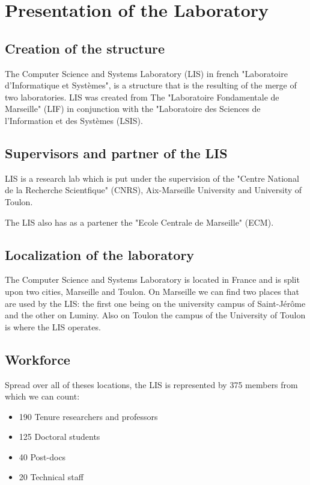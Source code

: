 \chapter{Presentation of the Laboratory}
\section{Creation of the structure}
The Computer Science and Systems Laboratory (LIS) in french "Laboratoire d’Informatique et Systèmes", is a structure that is the resulting of the merge of two laboratories. LIS was created from The "Laboratoire Fondamentale de Marseille" (LIF) in conjunction with the "Laboratoire des Sciences de l'Information et des Systèmes (LSIS).

\section{Supervisors and partner of the LIS}
LIS is a research lab which is put under the supervision of the "Centre National de la Recherche Scientfique" (CNRS), Aix-Marseille University and University of Toulon. 

The LIS also has as a partener the "Ecole Centrale de Marseille" (ECM).

\section{Localization of the laboratory}
The Computer Science and Systems Laboratory is located in France and is split upon two cities, Marseille and Toulon. On Marseille we can find two places that are used by the LIS: the first one being on the university campus of Saint-Jérôme and the other on Luminy. Also on Toulon the campus of the University of Toulon is where the LIS operates.
 
\section{Workforce}
Spread over all of theses locations, the LIS is represented by 375 members from which we can count:
\begin{itemize}[noitemsep, nolistsep]
	\item{190 Tenure researchers and professors}
	\item{125 Doctoral students}
	\item{40 Post-docs }
	\item{20 Technical staff}
\end{itemize} 

